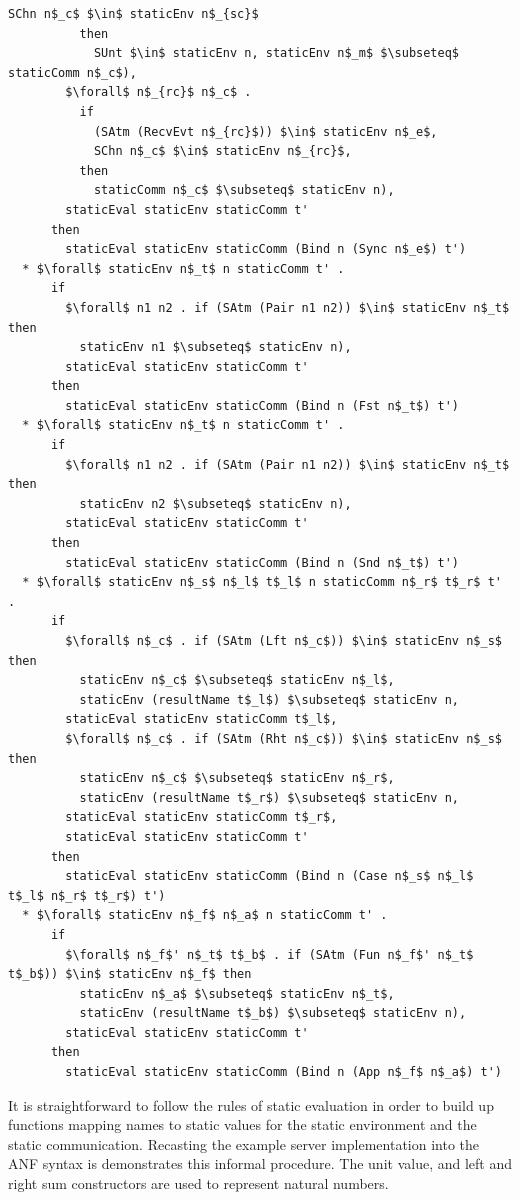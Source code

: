 \documentclass[letterpaper, 11pt]{extarticle}
\begin{document}
\begin{lstlisting}[language=logic, mathescape]
            SChn n$_c$ $\in$ staticEnv n$_{sc}$ 
          then
            SUnt $\in$ staticEnv n, staticEnv n$_m$ $\subseteq$ staticComm n$_c$),
        $\forall$ n$_{rc}$ n$_c$ . 
          if
            (SAtm (RecvEvt n$_{rc}$)) $\in$ staticEnv n$_e$,
            SChn n$_c$ $\in$ staticEnv n$_{rc}$, 
          then
            staticComm n$_c$ $\subseteq$ staticEnv n),
        staticEval staticEnv staticComm t'
      then
        staticEval staticEnv staticComm (Bind n (Sync n$_e$) t')
  * $\forall$ staticEnv n$_t$ n staticComm t' . 
      if
        $\forall$ n1 n2 . if (SAtm (Pair n1 n2)) $\in$ staticEnv n$_t$ then
          staticEnv n1 $\subseteq$ staticEnv n),
        staticEval staticEnv staticComm t'
      then
        staticEval staticEnv staticComm (Bind n (Fst n$_t$) t')
  * $\forall$ staticEnv n$_t$ n staticComm t' . 
      if
        $\forall$ n1 n2 . if (SAtm (Pair n1 n2)) $\in$ staticEnv n$_t$ then
          staticEnv n2 $\subseteq$ staticEnv n),
        staticEval staticEnv staticComm t'
      then
        staticEval staticEnv staticComm (Bind n (Snd n$_t$) t')
  * $\forall$ staticEnv n$_s$ n$_l$ t$_l$ n staticComm n$_r$ t$_r$ t' . 
      if
        $\forall$ n$_c$ . if (SAtm (Lft n$_c$)) $\in$ staticEnv n$_s$ then 
          staticEnv n$_c$ $\subseteq$ staticEnv n$_l$,
          staticEnv (resultName t$_l$) $\subseteq$ staticEnv n,
        staticEval staticEnv staticComm t$_l$,
        $\forall$ n$_c$ . if (SAtm (Rht n$_c$)) $\in$ staticEnv n$_s$ then 
          staticEnv n$_c$ $\subseteq$ staticEnv n$_r$, 
          staticEnv (resultName t$_r$) $\subseteq$ staticEnv n, 
        staticEval staticEnv staticComm t$_r$,
        staticEval staticEnv staticComm t'
      then
        staticEval staticEnv staticComm (Bind n (Case n$_s$ n$_l$ t$_l$ n$_r$ t$_r$) t')
  * $\forall$ staticEnv n$_f$ n$_a$ n staticComm t' . 
      if
        $\forall$ n$_f$' n$_t$ t$_b$ . if (SAtm (Fun n$_f$' n$_t$ t$_b$)) $\in$ staticEnv n$_f$ then 
          staticEnv n$_a$ $\subseteq$ staticEnv n$_t$, 
          staticEnv (resultName t$_b$) $\subseteq$ staticEnv n),
        staticEval staticEnv staticComm t'
      then
        staticEval staticEnv staticComm (Bind n (App n$_f$ n$_a$) t')
\end{lstlisting}

It is straightforward to follow the rules of static evaluation in order to build up
functions mapping names to static values for the static environment
and the static communication.
Recasting the example server implementation into the ANF syntax is demonstrates this informal procedure.
The unit value, and left and right sum constructors are used to represent natural numbers.
\end{document}
